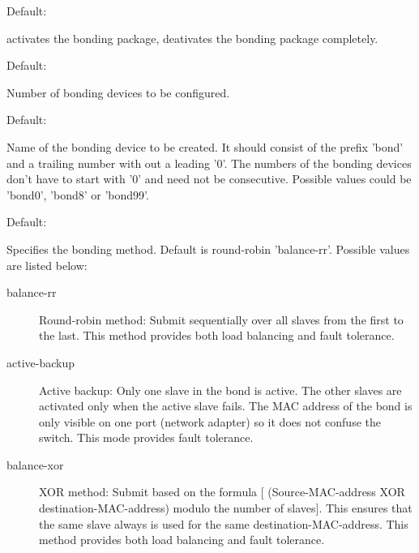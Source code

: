 \begin{description}


  Default: 

   activates the bonding package,  deativates the 
  bonding package completely.


  Default: 

  Number of bonding devices to be configured.


  Default: 

  Name of the bonding device to be created. It should consist of the 
  prefix 'bond' and a trailing number with out a leading '0'. The 
  numbers of the bonding devices don't have to start with '0' and 
  need not be consecutive. Possible values could be 'bond0', 'bond8'
  or 'bond99'.


  Default: 

  Specifies the bonding method. Default is round-robin
  'balance-rr'. Possible values are listed below: 

\begin{description}

\item [balance-rr]

  Round-robin method: Submit sequentially over all slaves from
  the first to the last. This method provides both load balancing
  and fault tolerance.

\item [active-backup]

  Active backup: Only one slave in the bond is active. The other 
  slaves are activated only when the active slave fails. The
  MAC address of the bond is only visible on one port (network 
  adapter) so it does not confuse the switch. This mode 
  provides fault tolerance.

\item [balance-xor]

  XOR method: Submit based on the formula [
  (Source-MAC-address XOR destination-MAC-address) modulo the 
  number of slaves]. This ensures that the same slave always is 
  used for the same destination-MAC-address. This method provides 
  both load balancing and fault tolerance.


\end{description}
\end{description}
